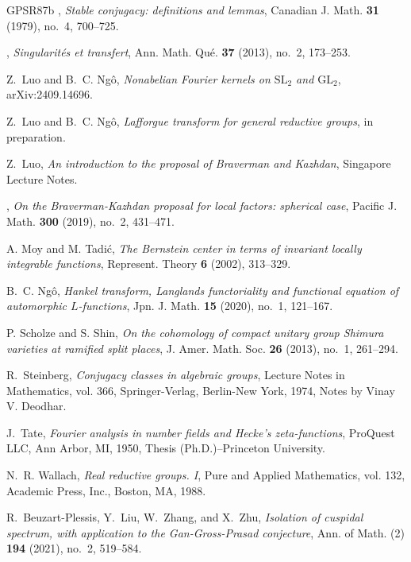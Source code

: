 \documentclass[iccmp]{ipbook}
\begin{document}
\begin{thebibliography}{GPSR87b}
\bysame, \emph{Stable conjugacy: definitions and lemmas}, Canadian J.
  Math. \textbf{31} (1979), no.~4, 700--725.

\bysame, \emph{Singularit\'{e}s et transfert}, Ann. Math. Qu\'{e}.
  \textbf{37} (2013), no.~2, 173--253.

Z.~Luo and B.~C. Ng\^{o}, \emph{Nonabelian {F}ourier kernels on $\mathrm{SL}_2$
  and $\mathrm{GL}_2$}, arXiv:2409.14696.

Z.~Luo and B.~C. Ng\^{o}, \emph{Lafforgue transform for general reductive groups},
  in preparation.

Z.~Luo, \emph{An introduction to the proposal of {B}raverman and {K}azhdan},
  Singapore Lecture Notes.

\bysame, \emph{On the {B}raverman-{K}azhdan proposal for local factors:
  spherical case}, Pacific J. Math. \textbf{300} (2019), no.~2, 431--471.

A. Moy and M. Tadi\'{c}, \emph{The {B}ernstein center in terms of
  invariant locally integrable functions}, Represent. Theory \textbf{6} (2002),
  313--329.

B.~C. Ng{\^o}, \emph{Hankel transform, {L}anglands functoriality and functional
  equation of automorphic {$L$}-functions}, Jpn. J. Math. \textbf{15} (2020),
  no.~1, 121--167.

P. Scholze and S. Shin, \emph{On the cohomology of compact unitary
  group {S}himura varieties at ramified split places}, J. Amer. Math. Soc.
  \textbf{26} (2013), no.~1, 261--294.

R.~Steinberg, \emph{Conjugacy classes in algebraic groups}, Lecture Notes in
  Mathematics, vol. 366, Springer-Verlag, Berlin-New York, 1974, Notes by Vinay
  V. Deodhar.

J.~Tate, \emph{Fourier analysis in number fields and {H}ecke's zeta-functions},
  ProQuest LLC, Ann Arbor, MI, 1950, Thesis (Ph.D.)--Princeton University.

N.~R. Wallach, \emph{Real reductive groups. {I}}, Pure and Applied Mathematics,
  vol. 132, Academic Press, Inc., Boston, MA, 1988.

R.~Beuzart-Plessis, Y.~Liu, W.~Zhang, and X.~Zhu, \emph{Isolation of cuspidal
  spectrum, with application to the {G}an-{G}ross-{P}rasad conjecture}, Ann. of
  Math. (2) \textbf{194} (2021), no.~2, 519--584.


\end{thebibliography}
\end{document}
